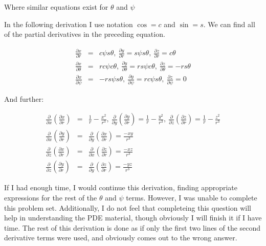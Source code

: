 \documentclass[a4paper,12pt]{article}
\begin{document}
Where similar equations exist for $\theta$ and $\psi$

In the following derivation I use notation $\cos = c$ and $\sin = s$. We can find all of the partial derivatives in the preceding equation.

\begin{eqnarray}
\frac{\partial x}{\partial r} &=& c\psi s\theta,\: \frac{\partial y}{\partial r} = s\psi s\theta,\: \frac{\partial z}{\partial r} = c\theta\nonumber\\
\frac{\partial x}{\partial \theta} &=& rc\psi c\theta,\: \frac{\partial y}{\partial\theta} = r s\psi c\theta,\:\frac{\partial z}{\partial \theta} = -rs\theta\nonumber\\
\frac{\partial x}{\partial \psi} &=& -rs\psi s\theta,\: \frac{\partial y}{\partial \psi} = rc\psi s\theta,\:\frac{\partial z}{\partial \psi} = 0\nonumber
\end{eqnarray}

And further:

\begin{eqnarray}
\frac{\partial}{\partial x}\left(\frac{\partial x}{\partial r}\right) &=& \frac{1}{r} - \frac{x^2}{r^3},\:
\frac{\partial}{\partial y}\left(\frac{\partial y}{\partial r}\right) = \frac{1}{r} - \frac{y^2}{r^3},\:
\frac{\partial}{\partial z}\left(\frac{\partial z}{\partial r}\right) = \frac{1}{r} - \frac{z^2}{r^3}\nonumber\\
\frac{\partial}{\partial x}\left(\frac{\partial y}{\partial r}\right) &=& \frac{\partial}{\partial y}\left(\frac{\partial x}{\partial r}\right) = \frac{-xy}{r^3}\nonumber\\
\frac{\partial}{\partial z}\left(\frac{\partial x}{\partial r}\right) &=& \frac{\partial}{\partial x}\left(\frac{\partial z}{\partial r}\right) = \frac{-xz}{r^3}\nonumber\\
\frac{\partial}{\partial z}\left(\frac{\partial y}{\partial r}\right) &=& \frac{\partial}{\partial y}\left(\frac{\partial z}{\partial r}\right) = \frac{-yz}{r^3}\nonumber
\end{eqnarray}

If I had enough time, I would continue this derivation, finding appropriate expressions for the rest of the $\theta$ and $\psi$ terms.
However, I was unable to complete this problem set. Additionally, I do not feel that completeing this question will help in understanding the PDE material, though obviously I will finish it if I have time. The rest of this derivation is done as if only the first two lines of the second derivative terms were used, and obviously comes out to the wrong answer.
\end{document}
